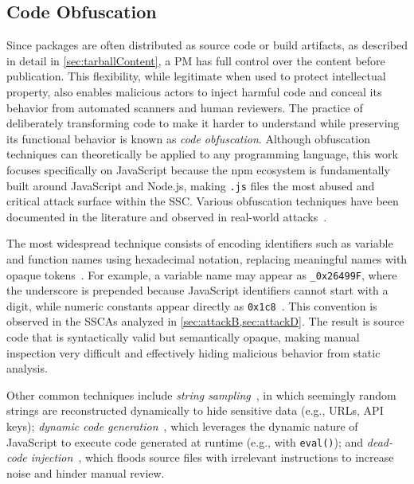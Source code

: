 \subsection{Code Obfuscation}
\label{subsec:CodeObfuscation}

Since packages are often distributed as source code or build artifacts,
as described in detail in \cref{sec:tarballContent},
a \ac{PM} has full control over the content before publication.
This flexibility, while legitimate when used to protect intellectual property,
also enables malicious actors to inject harmful code and conceal its behavior from automated scanners and human reviewers.
The practice of deliberately transforming code to make it harder to understand while preserving
its functional behavior is known as \emph{code obfuscation}.
Although obfuscation techniques can theoretically be applied to any programming language, 
this work focuses specifically on JavaScript because the \ac{npm} ecosystem is fundamentally built around JavaScript and Node.js, 
making \texttt{.js} files the most abused and critical attack surface within the \ac{SSC}.
Various obfuscation techniques have been documented in the literature and
observed in real-world attacks~\cite{ohm2020backstabbersknifecollectionreview, 9505063}.

The most widespread technique consists of encoding identifiers such as variable and function names using hexadecimal notation, 
replacing meaningful names with opaque tokens~\cite{ohm2020backstabbersknifecollectionreview}. 
For example, a variable name may appear as \texttt{\_0x26499F}, 
where the underscore is prepended because JavaScript identifiers cannot start with a digit, 
while numeric constants appear directly as \texttt{0x1c8}~\cite{hexadecimalsyntax}.
This convention is observed in the \acp{SSCA} analyzed in \cref{sec:attackB,sec:attackD}.
The result is source code that is syntactically valid but semantically opaque, 
making manual inspection very difficult and effectively hiding malicious behavior from static analysis.

Other common techniques include \emph{string sampling}~\cite{ohm2020backstabbersknifecollectionreview},
in which seemingly random strings are reconstructed dynamically to hide sensitive data (e.g., URLs, API keys);
\emph{dynamic code generation}~\cite{9505063}, 
which leverages the dynamic nature of JavaScript to execute code generated at runtime (e.g., with  \texttt{eval()});
and \emph{dead-code injection}~\cite{9505063}, 
which floods source files with irrelevant instructions to increase noise and hinder manual review.

